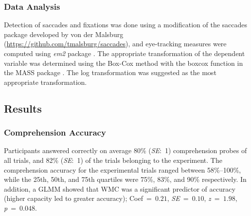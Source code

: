 \documentclass{frontiersSCNS}\usepackage{knitr}
\begin{document}
\subsubsection{Data Analysis}
Detection of saccades and fixations was done using a modification of the saccades package developed by von der Malsburg (\url{https://github.com/tmalsburg/saccades}), and eye-tracking measures were computed using \emph{em2} package \citep{LogacevVasishth2013}. The appropriate transformation of the dependent variable was determined using the Box-Cox method \citep{BoxCox1964,KlieglEtAl2010} with the boxcox function in the MASS package \citep{VenablesRipley2002}. The log transformation was suggested as the most appropriate transformation.



\subsection{Results}

\subsubsection{Comprehension Accuracy}


Participants answered correctly on average 80\% (\textit{SE}:~1) comprehension probes of all trials, and 82\% (\textit{SE}:~1) of the trials belonging to the experiment. The comprehension accuracy for the experimental trials ranged between 58\%--100\%, while the 25th, 50th, and 75th quartiles were 75\%, 83\%, and 90\% respectively. In addition, a GLMM showed that WMC was a significant predictor of accuracy (higher capacity led to greater accuracy); \mbox{Coef = $0.21$}, \mbox{\textit{SE} = $0.10$}, \mbox{\textit{z} = $1.98$}, \mbox{\textit{p} = $0.048$}.
\end{document}
